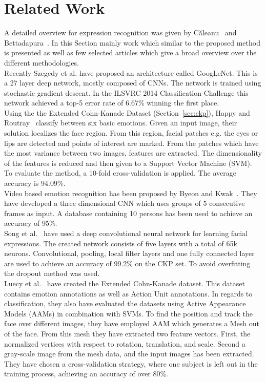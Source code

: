 \section{Related Work}
\label{sec:related}
A detailed overview for expression recognition was given by C\u{a}leanu~\cite{caleanu2013face} and Bettadapura~\cite{bettadapura2012face}. In this Section mainly work which similar to the proposed method is presented as well as few selected articles which give a broad overview over the different methodologies.\\



Recently Szegedy et al.\cite{DBLP:journals/corr/SzegedyLJSRAEVR14} have proposed an architecture called GoogLeNet. This is a 27 layer deep network, mostly composed of CNNs. The network is trained using stochastic gradient descent. In the ILSVRC 2014 Classification Challenge this network achieved a top-5 error rate of 6.67\% winning the first place. \\
Using the the Extended Cohn-Kanade Dataset (Section~\ref{sec:ckp}), Happy and Routray~\cite{6998925} classify between six basic emotions. Given an input image, their solution localizes the face region. From this region, facial patches e.g. the eyes or lips are detected and points of interest are marked. From the patches which have the most variance between two images, features are extracted. The dimensionality of the features is reduced and then given to a Support Vector Machine (SVM). To evaluate the method, a 10-fold cross-validation is applied. 
The average accuracy is 94.09\%.\\
Video based emotion recognition has been proposed by Byeon and Kwak~\cite{byeonfacial}. They have developed a three dimensional CNN which uses groups of 5 consecutive frames as input. A database containing 10 persons has been used to achieve an accuracy of 95\%.\\
Song et al.~\cite{song2014deep} have used a deep convolutional neural network for learning facial expressions. The created network consists of five layers with a total of 65k neurons. Convolutional, pooling, local filter layers and one fully connected layer are used to achieve an accuracy of 99.2\% on the CKP set. To avoid overfitting the dropout method was used.\\
Luecy et al.~\cite{5543262} have created the Extended Cohn-Kanade dataset. This dataset contains emotion annotations as well as Action Unit annotations. In regards to classification, they also have evaluated the datasets using Active Appearance Models (AAMs) in combination with SVMs. To find the position and track the face over different images, they have employed AAM which generates a Mesh out of the face. From this mesh they have extracted two feature vectors. First, the normalized vertices with respect to rotation, translation, and scale. Second a gray-scale image from the mesh data, and the input images has been extracted. They have chosen a cross-validation strategy, where one subject is left out in the training process, achieving an accuracy of over 80\%.\\

